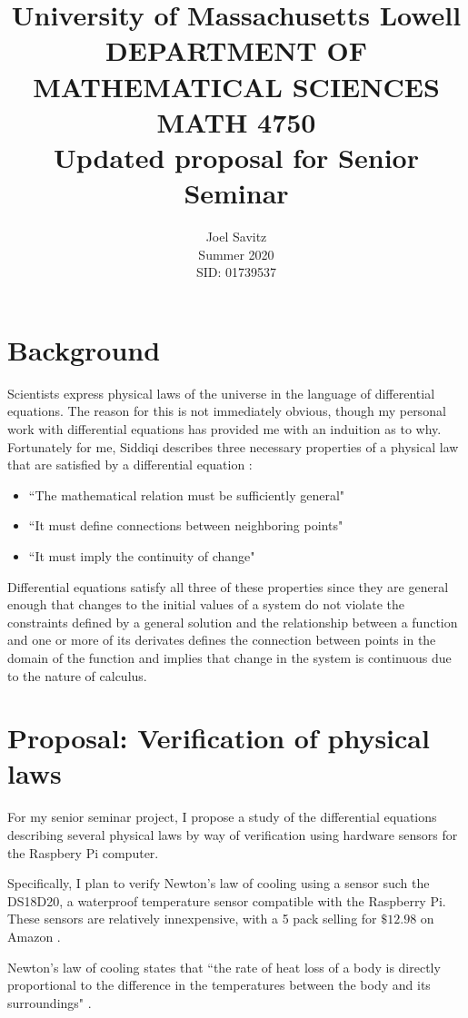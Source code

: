 \documentclass[12pt]{amsart}
\title{ University of Massachusetts Lowell \protect\\
	DEPARTMENT OF MATHEMATICAL SCIENCES \protect\\
MATH 4750 \protect\\
Updated proposal for Senior Seminar}
\author{Joel Savitz \\ Summer  2020 \\ SID: 01739537}
\begin{document}
\maketitle

\section{Background}

Scientists express physical laws of
the universe in the language of differential equations.
The reason for this is not immediately obvious,
though my personal work with differential equations
has provided me with an induition as to why.
Fortunately for me,
Siddiqi describes three necessary properties
of a physical law that are satisfied by a differential equation \cite{whydiffeq}:


\begin{itemize}
	\item ``The mathematical relation must be sufficiently general"
	\item ``It must define connections between neighboring points"
	\item ``It must imply the continuity of change"
\end{itemize}

Differential equations satisfy all three of these properties
since they are general enough that
changes to the initial values of a system
do not violate the constraints defined by a general solution
and the relationship between a function and one or more of its derivates
defines the connection between points in the domain of the function
and implies that change in the system is continuous
due to the nature of calculus.

\section{Proposal: Verification of physical laws}

For my senior seminar project,
I propose a study of
the differential equations describing several physical laws
by way of verification
using hardware sensors
for the Raspbery Pi computer.

Specifically, I plan to verify Newton's law of cooling
using a sensor such the DS18D20,
a waterproof temperature sensor compatible with the Raspberry Pi.
These sensors are relatively innexpensive,
with a 5 pack selling for $\$12.98$ on Amazon \cite{Amazon}.

Newton's law of cooling states that
``the rate of heat loss of a body is
directly proportional to the difference
in the temperatures between the body and
its surroundings" \cite{wiki}.
\end{document}
